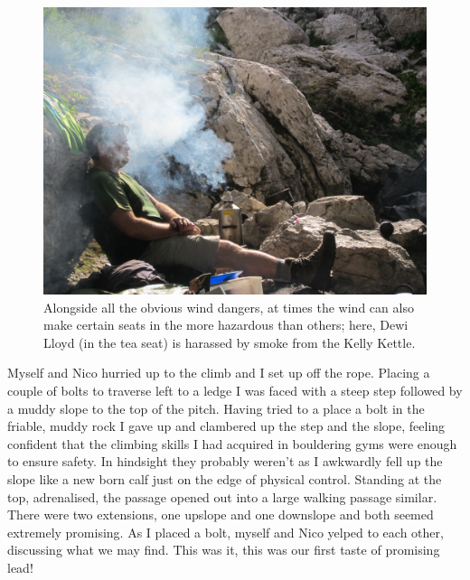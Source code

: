 \begin{figure}[t!]
\checkoddpage \ifoddpage \forcerectofloat \else \forceversofloat \fi
   \centering
\includegraphics[width = \textwidth]{2012/piss_bandits/2012-07-28-1835-TharatornSupasiti-IMG_0111--orig.jpg}
\caption{Alongside all the obvious wind dangers, at times the wind can also make certain seats in the  more hazardous than others; here, Dewi Lloyd (in the tea seat) is harassed by smoke from the Kelly Kettle. } \label{kettle smoke}
\end{figure}

Myself and Nico hurried up  to the climb and I set up off the
rope. Placing a couple of bolts to traverse left to a ledge I was faced
with a steep step followed by a muddy slope to the top of the pitch.
Having tried to a place a bolt in the friable, muddy rock I gave up and
clambered up the step and the slope, feeling confident that the climbing
skills I had acquired in  bouldering gyms were enough to ensure
safety. In hindsight they probably weren't as I awkwardly fell up the
slope like a new born calf just on the edge of physical control.
Standing at the top, adrenalised, the passage opened out into a large
walking passage similar. There were two extensions, one upslope and one
downslope and both seemed extremely promising. As I placed a bolt,
myself and Nico yelped to each other, discussing what we may find. This
was it, this was our first taste of promising lead!


